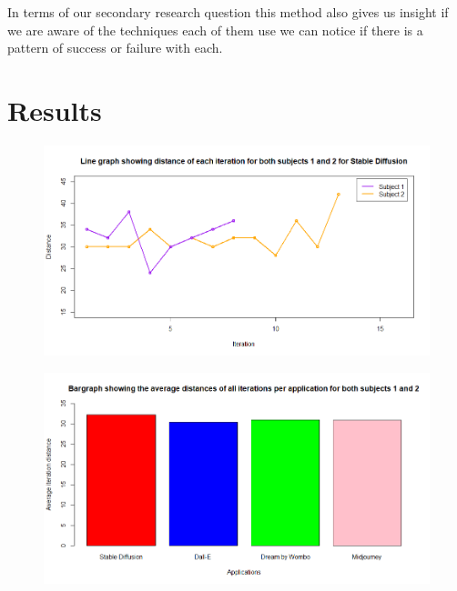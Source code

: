 \documentclass[]{report}
\begin{document}
	In terms of our secondary research question this method also gives us insight if we are aware of the techniques each of them use we can notice if there is a pattern of success or failure with each.
	
	\pagebreak
	
	\section{Results}

	\newpage
    
    
	\begin{figure}
		\centering
		\includegraphics[width=1\linewidth]{LineGraphStableDiff}
		\caption{}
		\label{fig:linegraphstablediff}
	\end{figure}

\begin{figure}
	\centering
	\includegraphics[width=1\linewidth]{Bargraph}
	\caption{}
	\label{fig:bargraph}
\end{figure}
\end{document}
